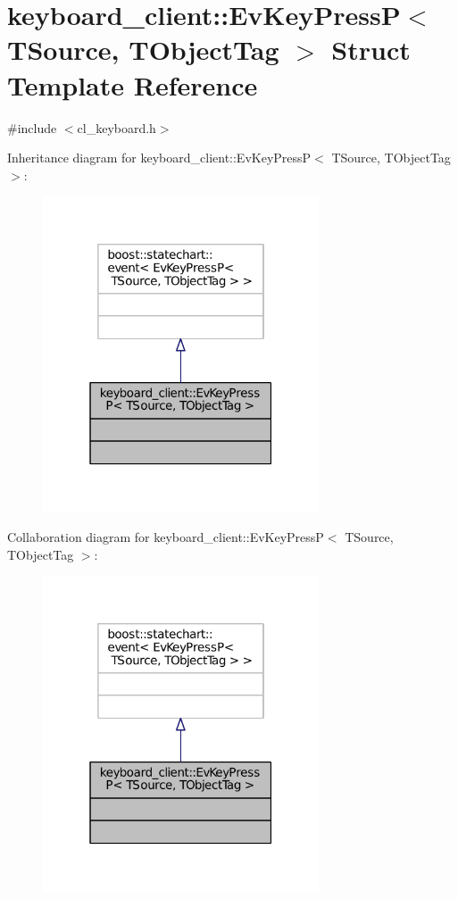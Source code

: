\hypertarget{structkeyboard__client_1_1EvKeyPressP}{}\section{keyboard\+\_\+client\+:\+:Ev\+Key\+PressP$<$ T\+Source, T\+Object\+Tag $>$ Struct Template Reference}
\label{structkeyboard__client_1_1EvKeyPressP}


{\ttfamily \#include $<$cl\+\_\+keyboard.\+h$>$}



Inheritance diagram for keyboard\+\_\+client\+:\+:Ev\+Key\+PressP$<$ T\+Source, T\+Object\+Tag $>$\+:
\nopagebreak
\begin{figure}[H]
\begin{center}
\leavevmode
\includegraphics[width=232pt]{structkeyboard__client_1_1EvKeyPressP__inherit__graph}
\end{center}
\end{figure}


Collaboration diagram for keyboard\+\_\+client\+:\+:Ev\+Key\+PressP$<$ T\+Source, T\+Object\+Tag $>$\+:
\nopagebreak
\begin{figure}[H]
\begin{center}
\leavevmode
\includegraphics[width=232pt]{structkeyboard__client_1_1EvKeyPressP__coll__graph}
\end{center}
\end{figure}


